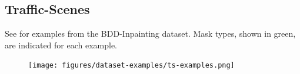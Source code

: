 \subsection{Traffic-Scenes}
See  for examples from the BDD-Inpainting dataset. Mask types, shown in green, are indicated for each example.
\begin{figure}[h!]
\begin{center}
    \centering
    \captionsetup{type=figure}
    \texttt{[image: figures/dataset-examples/ts-examples.png]}
    \label{fig:ts-examples}
\end{center}
\end{figure}